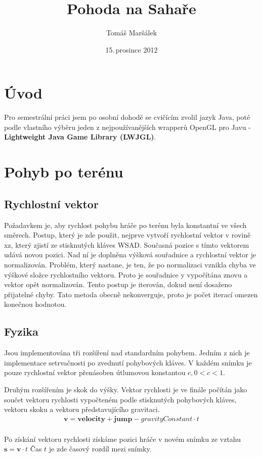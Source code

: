 \documentclass{zcu_sp}
\title{Pohoda na Sahaře}
\author{Tomáš Maršálek}
\date{15.\,prosince 2012}
\begin{document}
\maketitle
\section{Úvod}
Pro semestrální práci jsem po osobní dohodě se cvičícím zvolil jazyk Java, poté
podle vlastního výběru jeden z nejpoužívanějších wrapperů OpenGL pro Javu -
\textbf {Lightweight Java Game Library (LWJGL)}.

\section{Pohyb po terénu}
\subsection{Rychlostní vektor}
Požadavkem je, aby rychlost pohybu hráče po terénu byla konstantní ve všech
směrech. Postup, který je zde použit, nejprve vytvoří rychlostní vektor v rovině
xz, který zjistí ze stisknutých kláves WSAD. Současná pozice s tímto vektorem
udává novou pozici. Nad ní je doplněna výšková souřadnice a rychlostní vektor
je normalizován. Problém, který nastane, je ten, že po normalizaci vznikla
chyba ve výškové složce rychlostního vektoru. Proto je souřadnice y vypočítána
znovu a vektor opět normalizován. Tento postup je iterován, dokud není dosaženo
přijatelné chyby. Tato metoda obecně nekonverguje, proto je počet iterací
omezen konečnou hodnotou.

\subsection{Fyzika}
Jsou implementována tři rozšíření nad standardním pohybem. Jedním z nich je
implementace setrvačnosti po zvednutí pohybových kláves. V každém snímku je
pouze rychlostní vektor přenásoben útlumovou konstantou $c, 0 < c < 1$.

Druhým rozšířením je skok do výšky. Vektor rychlosti je ve finále počítán jako
součet vektoru rychlosti vypočteném podle stisknutých pohybových kláves,
vektoru skoku a vektoru představujícího gravitaci.
\begin{align*}
\mathbf{v} = \mathbf{velocity}+ \mathbf{jump} - gravityConstant \cdot t \\
\end{align*}

Po získání vektoru rychlosti získáme pozici hráče v novém snímku ze vztahu
$\mathbf{s} = \mathbf{v} \cdot t$
Čas $t$ je zde časový rozdíl mezi snímky.
\end{document}
